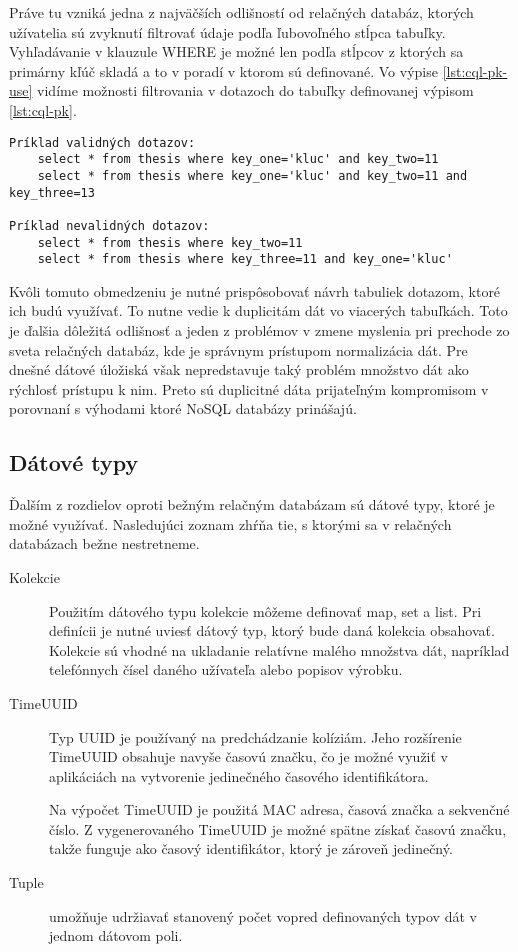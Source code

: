 	Práve tu vzniká jedna z najväčších odlišností od relačných databáz, ktorých užívatelia sú zvyknutí filtrovať údaje podľa ľubovoľného stĺpca tabuľky. Vyhľadávanie v klauzule WHERE je možné len podľa stĺpcov z ktorých sa primárny kľúč skladá a to v poradí v ktorom sú definované. Vo výpise \ref{lst:cql-pk-use} vidíme možnosti filtrovania v dotazoch do tabuľky definovanej výpisom \ref{lst:cql-pk}.
	
	\begin{lstlisting}[label=lst:cql-pk-use,caption=Príklad vyhľadávanie v tabuľke thesis]
Príklad validných dotazov:
	select * from thesis where key_one='kluc' and key_two=11
	select * from thesis where key_one='kluc' and key_two=11 and key_three=13
		
Príklad nevalidných dotazov:
	select * from thesis where key_two=11
	select * from thesis where key_three=11 and key_one='kluc'
	\end{lstlisting}
	
	Kvôli tomuto obmedzeniu je nutné prispôsobovať návrh tabuliek dotazom, ktoré ich budú využívať. To nutne vedie k duplicitám dát vo viacerých tabuľkách. Toto je ďalšia dôležitá odlišnosť a jeden z problémov v zmene myslenia pri prechode zo sveta relačných databáz, kde je správnym prístupom normalizácia dát. Pre dnešné dátové úložiská však nepredstavuje taký problém množstvo dát ako rýchlosť prístupu k nim. Preto sú duplicitné dáta prijateľným kompromisom v porovnaní s výhodami ktoré NoSQL databázy prinášajú.

	\subsection{Dátové typy}
	Ďalším z rozdielov oproti bežným relačným databázam sú dátové typy, ktoré je možné využívať. Nasledujúci zoznam zhŕňa tie, s ktorými sa v relačných databázach bežne nestretneme.
	\begin{description}
		\item[Kolekcie] Použitím dátového typu kolekcie môžeme definovať map, set a list. Pri definícii je nutné uviesť dátový typ, ktorý bude daná kolekcia obsahovať. Kolekcie sú vhodné na ukladanie relatívne malého množstva dát, napríklad telefónnych čísel daného užívateľa alebo popisov výrobku. 

		\item[TimeUUID] Typ UUID je používaný na predchádzanie kolíziám. Jeho rozšírenie TimeUUID obsahuje navyše časovú značku, čo je možné využiť v aplikáciách na vytvorenie jedinečného časového identifikátora.
		
		Na výpočet TimeUUID je použitá MAC adresa, časová značka a sekvenčné číslo. Z vygenerovaného TimeUUID je možné spätne získať časovú značku, takže funguje ako časový identifikátor, ktorý je zároveň jedinečný.
		
		\item[Tuple] umožňuje udržiavať stanovený počet vopred definovaných typov dát v jednom dátovom poli.
	\end{description}

